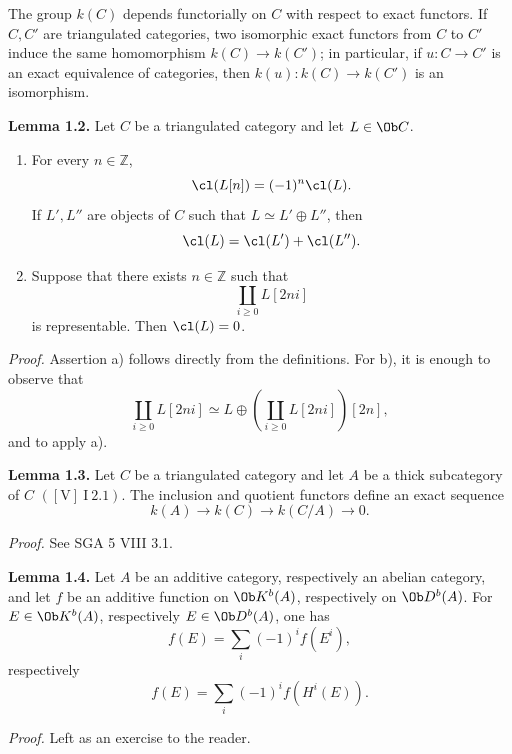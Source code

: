 The group \(k(C)\) depends functorially on \(C\) with respect to exact functors. If \(C,C'\) are triangulated categories, two isomorphic exact functors from \(C\) to \(C'\) induce the same homomorphism \(k(C)\to k(C')\); in particular, if \(u:C\to C'\) is an exact equivalence of categories, then \(k(u):k(C)\to k(C')\) is an isomorphism.

\textbf{Lemma 1.2.} Let \(C\) be a triangulated category and let \(L\in\Ob C\).
\begin{enumerate}[label=\alph*)]
\item For every \(n\in\mathbb Z\),
\[
 \cl(L[n])=(-1)^n\cl(L).
\]
If \(L',L''\) are objects of \(C\) such that \(L\simeq L'\oplus L''\), then
\[
 \cl(L)=\cl(L')+\cl(L'').
\]
\item Suppose that there exists \(n\in\mathbb Z\) such that
\[
 \coprod_{i\geq0} L[2ni]
\]
is representable. Then \(\cl(L)=0\).
\end{enumerate}

\emph{Proof.} Assertion a) follows directly from the definitions. For b), it is enough to observe that
\[
 \coprod_{i\geq0} L[2ni]\simeq
 L\oplus\left(\coprod_{i\geq0}L[2ni]\right)[2n],
\]
and to apply a).

\textbf{Lemma 1.3.} Let \(C\) be a triangulated category and let \(A\) be a thick subcategory of \(C\) \(([\mathrm V]\ \mathrm{I}\ 2.1)\). The inclusion and quotient functors define an exact sequence
\[
 k(A)\longrightarrow k(C)\longrightarrow k(C/A)\longrightarrow 0.
\]

\emph{Proof.} See SGA 5 VIII 3.1.

\textbf{Lemma 1.4.} Let \(A\) be an additive category, respectively an abelian category, and let \(f\) be an additive function on \(\Ob K^b(A)\), respectively on \(\Ob D^b(A)\). For \(E\in\Ob K^b(A)\), respectively \(E\in\Ob D^b(A)\), one has
\[
 f(E)=\sum_i(-1)^i f(E^i),
\]
respectively
\[
 f(E)=\sum_i(-1)^i f(H^i(E)).
\]

\emph{Proof.} Left as an exercise to the reader.

